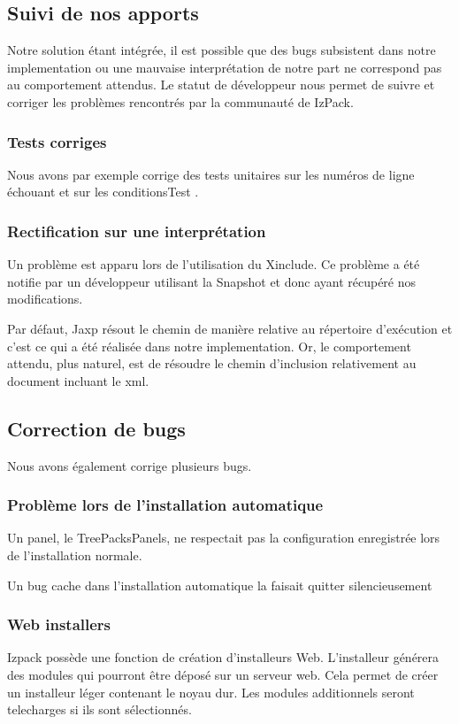 \subsection{Suivi de nos apports}
Notre solution étant intégrée, il est possible que des bugs subsistent dans notre implementation ou une mauvaise interprétation de notre part ne correspond pas au comportement attendus. Le statut de développeur nous permet de suivre et corriger les problèmes rencontrés par la communauté de IzPack.
\subsubsection{Tests corriges}
Nous avons par exemple corrige des tests unitaires sur les numéros de ligne échouant \cite{IZPACK-306} et sur les conditionsTest \cite{IZPACK-305}.
\subsubsection{Rectification sur une interprétation}
Un problème est apparu lors de l'utilisation du Xinclude\cite{IZPACK-303}. Ce problème a été notifie par un développeur utilisant la Snapshot et donc ayant récupéré nos modifications.

Par défaut, Jaxp résout le chemin de manière relative au répertoire d'exécution et c'est ce qui a été réalisée dans notre implementation. Or, le comportement attendu, plus naturel, est de résoudre le chemin d'inclusion relativement au document incluant le xml.
\subsection{Correction de bugs}
Nous avons également corrige plusieurs bugs.
\subsubsection{Problème lors de l'installation automatique}
Un panel, le TreePacksPanels, ne respectait pas la configuration enregistrée lors de l'installation normale.\cite{IZPACK-223}

Un bug cache dans l'installation automatique la faisait quitter silencieusement \cite{IZPACK-309}
\subsubsection{Web installers}
Izpack possède une fonction de création d'installeurs Web. L'installeur générera des modules qui pourront être déposé sur un serveur web. Cela permet de créer un installeur léger contenant le noyau dur. Les modules additionnels seront telecharges si ils sont sélectionnés.

